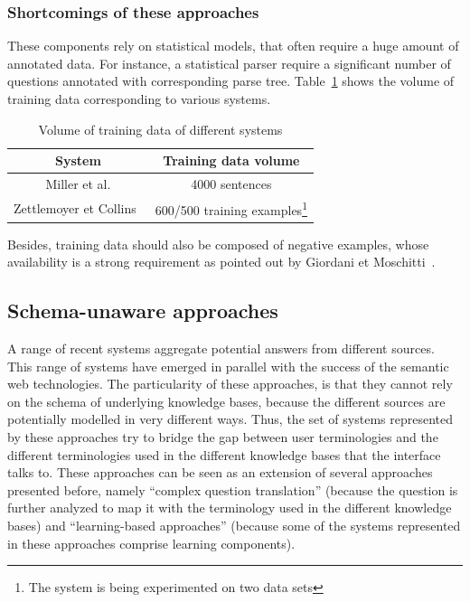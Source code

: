 \documentclass[10pt,journal,letterpaper,compsoc]{IEEEtran}
\begin{document}
\subsubsection{Shortcomings of these approaches}
These components rely on statistical models, that often require a huge amount of
annotated data.
For instance, a statistical parser require a significant number of questions
annotated with corresponding parse tree. Table~\ref{tab:training-data} shows the
volume of training data corresponding to various systems.
\begin{table}
\centering
\begin{tabular}{|c|c|}\hline
{\bf System} & {\bf Training data volume}\\\hline\hline
Miller et al. & 4000 sentences\\\hline
Zettlemoyer et Collins~\cite{DBLP:conf/uai/ZettlemoyerC05} & 600/500 training
examples\footnote{The system is being experimented on two data sets}\\\hline
\end{tabular}
\caption{Volume of training data of different systems}
\label{tab:training-data}
\end{table}
Besides, training data should also be composed of negative examples, whose
availability is a strong requirement as pointed out by Giordani et
Moschitti~\cite{Giordani:2009:SSK:1617768.1617815}.


\subsection{Schema-unaware approaches}
A range of recent systems aggregate potential answers from different sources.
This range of systems have emerged in parallel with the success of the semantic
web technologies. 
The particularity of these approaches, is that they cannot rely on the schema of
underlying knowledge bases, because the different sources are potentially
modelled in very different ways. 
Thus, the set of systems represented by these approaches try to bridge the gap
between user terminologies and the different terminologies used in the different
knowledge bases that the interface talks to.
These approaches can be seen as an extension of several approaches presented
before, namely ``complex question translation'' (because the question is
further analyzed to map it with the terminology used in the different knowledge
bases) and ``learning-based approaches'' (because some of the systems
represented in these approaches comprise learning components).
\end{document}
